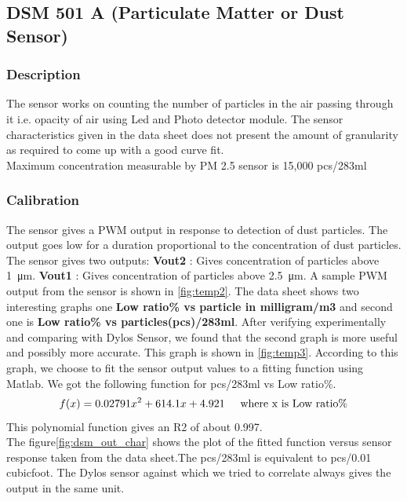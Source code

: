 \documentclass[a4paper,12pt]{article}
\begin{document}
\subsection{DSM 501 A (Particulate Matter or Dust Sensor)}
% 
% 
\subsubsection{Description} 
The sensor works on counting the number of particles in the air passing through it i.e. opacity of air using Led and Photo detector module. The sensor characteristics given in the data sheet does not present the amount of granularity as required to come up with a good curve fit.
\\
Maximum concentration measurable by PM 2.5 sensor is 15,000 pcs/283ml

\subsubsection{Calibration}
The sensor gives a PWM output in response to detection of dust particles. The output goes low for a duration proportional to the concentration of dust particles. The sensor gives two outputs:
\newline \textbf{Vout2} : Gives concentration of particles above \SI{1}{\micro\metre}.
\newline \textbf{Vout1} : Gives concentration of particles above \SI{2.5}{\micro\metre}.
\newline A sample PWM output from the sensor is shown in \ref{fig:temp2}. The data sheet shows two interesting graphs one \textbf{Low ratio\% vs particle in milligram/m3} and second one is\textbf{ Low ratio\% vs particles(pcs)/283ml}. After verifying experimentally and comparing with Dylos Sensor, we found that the second graph is more useful and possibly more accurate. This graph is shown in \ref{fig:temp3}. According to this graph, we choose to fit the sensor output values to a fitting function using Matlab. We got the following function for pcs/283ml vs Low ratio\%.
\begin{equation}
f(x) = 0.02791x^2 + 614.1x + 4.921
\hspace{0.5cm} \textnormal{where x is Low ratio\%}
% 
% 
% 
\end{equation}
This polynomial function gives an R2 of about 0.997.
\\
\newline
The figure\ref{fig:dsm_out_char} shows the plot of the fitted function versus sensor response taken from the data sheet.The pcs/283ml is equivalent to pcs/0.01 cubicfoot. The Dylos sensor against which we tried to correlate always gives the output in the same unit.
\end{document}

